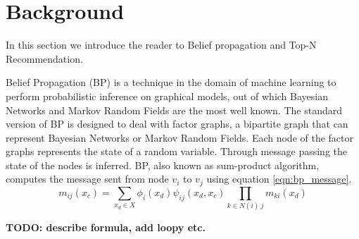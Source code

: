 \section{Background}\label{sec:background}

In this section we introduce the reader to Belief propagation and Top-N Recommendation.

Belief Propagation (BP) is a technique in the domain of machine learning to perform probabilistic inference on graphical models, out of which Bayesian Networks and Markov Random Fields are the most well known. The standard version of BP is designed to deal with factor graphs, a bipartite graph that can represent Bayesian Networks or Markov Random Fields. Each node of the factor graphs represents the state of a random variable. Through message passing the state of the nodes is inferred. BP, also known as sum-product algorithm, computes the message sent from node $v_i$ to $v_j$ using equation \ref{eqn:bp_message}.
\begin{equation}                                                            
\label{eqn:bp_message}
m_{ij}(x_c) = \sum_{x_d \in X}\phi_i(x_d)\psi_{ij}(x_d,x_c)\prod_{k \in N(i) \ j}m_{ki}(x_d)
\end{equation}

\textbf{TODO: describe formula, add loopy etc.} \\


